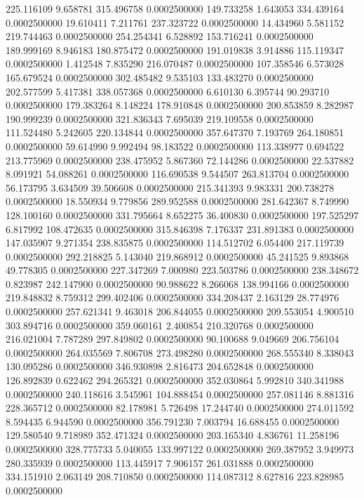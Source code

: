 225.116109 9.658781 315.496758 0.0002500000
149.733258 1.643053 334.439164 0.0002500000
19.610411 7.211761 237.323722 0.0002500000
14.434960 5.581152 219.744463 0.0002500000
254.254341 6.528892 153.716241 0.0002500000
189.999169 8.946183 180.875472 0.0002500000
191.019838 3.914886 115.119347 0.0002500000
1.412548 7.835290 216.070487 0.0002500000
107.358546 6.573028 165.679524 0.0002500000
302.485482 9.535103 133.483270 0.0002500000
202.577599 5.417381 338.057368 0.0002500000
6.610130 6.395744 90.293710 0.0002500000
179.383264 8.148224 178.910848 0.0002500000
200.853859 8.282987 190.999239 0.0002500000
321.836343 7.695039 219.109558 0.0002500000
111.524480 5.242605 220.134844 0.0002500000
357.647370 7.193769 264.180851 0.0002500000
59.614990 9.992494 98.183522 0.0002500000
113.338977 0.694522 213.775969 0.0002500000
238.475952 5.867360 72.144286 0.0002500000
22.537882 8.091921 54.088261 0.0002500000
116.690538 9.544507 263.813704 0.0002500000
56.173795 3.634509 39.506608 0.0002500000
215.341393 9.983331 200.738278 0.0002500000
18.550934 9.779856 289.952588 0.0002500000
281.642367 8.749990 128.100160 0.0002500000
331.795664 8.652275 36.400830 0.0002500000
197.525297 6.817992 108.472635 0.0002500000
315.846398 7.176337 231.891383 0.0002500000
147.035907 9.271354 238.835875 0.0002500000
114.512702 6.054400 217.119739 0.0002500000
292.218825 5.143040 219.868912 0.0002500000
45.241525 9.893868 49.778305 0.0002500000
227.347269 7.000980 223.503786 0.0002500000
238.348672 0.823987 242.147900 0.0002500000
90.988622 8.266068 138.994166 0.0002500000
219.848832 8.759312 299.402406 0.0002500000
334.208437 2.163129 28.774976 0.0002500000
257.621341 9.463018 206.844055 0.0002500000
209.553054 4.900510 303.894716 0.0002500000
359.060161 2.400854 210.320768 0.0002500000
216.021004 7.787289 297.849802 0.0002500000
90.100688 9.049669 206.756104 0.0002500000
264.035569 7.806708 273.498280 0.0002500000
268.555340 8.338043 130.095286 0.0002500000
346.930898 2.816473 204.652848 0.0002500000
126.892839 0.622462 294.265321 0.0002500000
352.030864 5.992810 340.341988 0.0002500000
240.118616 3.545961 104.888454 0.0002500000
257.081146 8.881316 228.365712 0.0002500000
82.178981 5.726498 17.244740 0.0002500000
274.011592 8.594435 6.944590 0.0002500000
356.791230 7.003794 16.688455 0.0002500000
129.580540 9.718989 352.471324 0.0002500000
203.165340 4.836761 11.258196 0.0002500000
328.775733 5.040055 133.997122 0.0002500000
269.387952 3.949973 280.335939 0.0002500000
113.445917 7.906157 261.031888 0.0002500000
334.151910 2.063149 208.710850 0.0002500000
114.087312 8.627816 223.828985 0.0002500000
